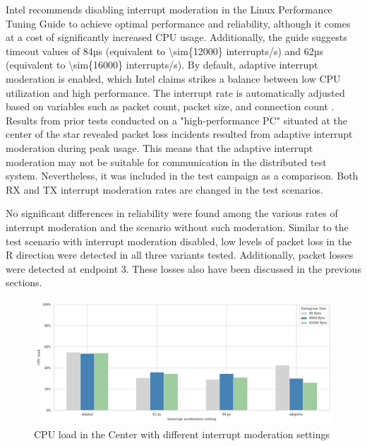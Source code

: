 \documentclass[11pt]{article}
\begin{document}
Intel recommends disabling interrupt moderation in the Linux Performance Tuning Guide \cite{tbd} to achieve optimal performance and reliability, although it comes at a cost of significantly increased CPU usage. Additionally, the guide suggests timeout values of 84µs (equivalent to \num{\sim{12000}} interrupts/s) and 62µs (equivalent to \num{\sim{16000}} interrupts/s). By default, adaptive interrupt moderation is enabled, which Intel claims strikes a balance between low CPU utilization and high performance. The interrupt rate is automatically adjusted based on variables such as packet count, packet size, and connection count \cite{tbd}. Results from prior tests conducted on a "high-performance PC" situated at the center of the star revealed packet loss incidents resulted from adaptive interrupt moderation during peak usage. This means that the adaptive interrupt moderation may not be suitable for communication in the distributed test system. Nevertheless, it was included in the test campaign as a comparison. Both RX and TX interrupt moderation rates are changed in the test scenarios.

No significant differences in reliability were found among the various rates of interrupt moderation and the scenario without such moderation. Similar to the test scenario with interrupt moderation disabled, low levels of packet loss in the R direction were detected in all three variants tested. Additionally, packet losses were detected at endpoint 3. These losses also have been discussed in the previous sections.

\begin{figure}[h]
	\includegraphics[width=\textwidth]{fig10.png}
	\centering
	\caption{CPU load in the Center with different interrupt moderation settings}
    \label{fig:fig10}
\end{figure}
\end{document}
